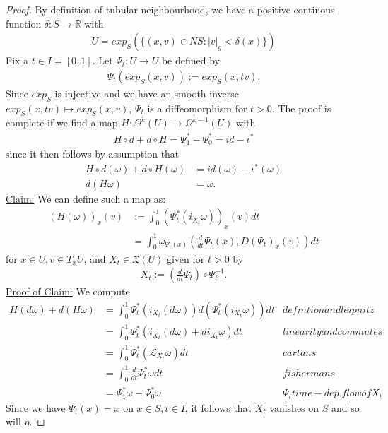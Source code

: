 \begin{proof}
By definition of tubular neighbourhood, we have a positive continous function $\delta : S \to \mathbb{R}$ with 
\begin{align*}
U = exp_S(\{ (x,v) \in NS : |v|_g < \delta(x) \})
\end{align*}
Fix a $t \in I =[0,1]$. Let $\Psi_t: U \to U$ be defined by
\begin{align*}
\Psi_t(exp_S(x,v)) := exp_S(x,tv) .
\end{align*}
Since $exp_S$ is injective and we have an smooth inverse $exp_S(x,tv) \mapsto exp_S(x,v)$, $\Psi_t$ is a diffeomorphism for $t>0$.
The proof is complete if we find a map $H: \Omega^k(U) \to \Omega^{k-1}(U)$  with
\begin{align*}
H \circ d + d \circ H = \Psi^*_1 - \Psi^*_0 = id - \iota^*
\end{align*}
since it then follows by assumption that
\begin{align*}
H \circ d(\omega) + d \circ H(\omega) &= id(\omega) - \iota^*(\omega) \\
d(H\omega) &= \omega .
\end{align*} 
\underline{Claim:} We can define such a map as:
\begin{align*}
(H(\omega))_x(v) &:= \int^1_0 (\Psi^*_t(i_{X_t} \omega))_x(v) dt \\
&= \int^1_0 \omega_{\Psi_t(x)} \left( \frac{d}{dt} \Psi_t(x), D(\Psi_t)_x(v) \right) dt
\end{align*}
for $x\in U , v\in T_xU$, and $X_t \in \mathfrak{X}(U)$ given for $t>0$ by
\begin{align*}
X_t := \left( \frac{d}{dt} \Psi_t \right) \circ \Psi^{-1}_t .
\end{align*}
\underline{Proof of Claim:}
We compute
\begin{align*}
H(d\omega) + d(H\omega) &= \int^1_0 \Psi^*_t(i_{X_t}(d\omega)) d(\Psi^*_t(i_{X_t}\omega)) dt &defintion and leipnitz\\
&= \int^1_0 \Psi^*_t(i_{X_t}(d\omega) + d i_{X_t}\omega) dt & linearity and commutes \\
&= \int^1_0 \Psi^*_t (\mathcal{L}_{X_t} \omega) dt & cartans \\
&= \int^1_0 \frac{d}{dt} \Psi^*_t \omega dt & fishermans\\
&= \Psi^*_1 \omega - \Psi^*_0 \omega &\Psi_t time-dep. flow of X_t
\end{align*}
Since we have $\Psi_t(x) = x$ on $x \in S, t \in I$, it follows that $X_t$ vanishes on $S$ and so will $\eta$.
\end{proof}


